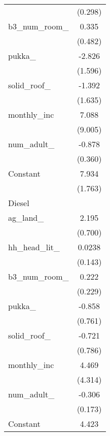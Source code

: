 {\begin{tabular}{l*{1}{c}}
                    &     (0.298)         \\
\addlinespace
b3\_num\_room\_        &       0.335         \\
                    &     (0.482)         \\
\addlinespace
pukka\_              &      -2.826\sym{*}  \\
                    &     (1.596)         \\
\addlinespace
solid\_roof\_         &      -1.392         \\
                    &     (1.635)         \\
\addlinespace
monthly\_inc         &       7.088         \\
                    &     (9.005)         \\
\addlinespace
num\_adult\_          &      -0.878\sym{**} \\
                    &     (0.360)         \\
\addlinespace
Constant            &       7.934\sym{***}\\
                    &     (1.763)         \\
\midrule
Diesel              &                     \\
ag\_land\_            &       2.195\sym{***}\\
                    &     (0.700)         \\
\addlinespace
hh\_head\_lit\_        &      0.0238         \\
                    &     (0.143)         \\
\addlinespace
b3\_num\_room\_        &       0.222         \\
                    &     (0.229)         \\
\addlinespace
pukka\_              &      -0.858         \\
                    &     (0.761)         \\
\addlinespace
solid\_roof\_         &      -0.721         \\
                    &     (0.786)         \\
\addlinespace
monthly\_inc         &       4.469         \\
                    &     (4.314)         \\
\addlinespace
num\_adult\_          &      -0.306\sym{*}  \\
                    &     (0.173)         \\
\addlinespace
Constant            &       4.423\sym{***}\\

\end{tabular}}
